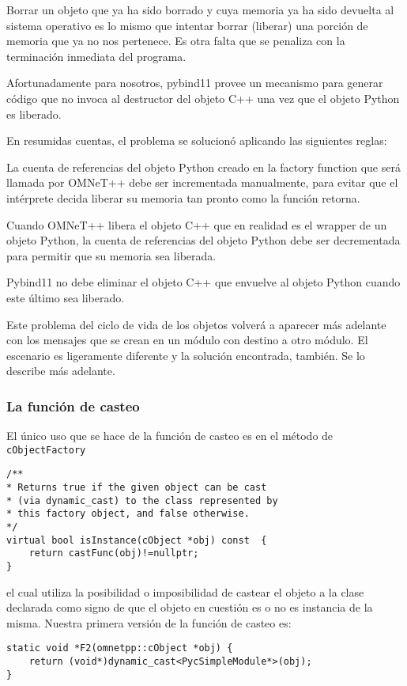 \documentclass[]{article}
\begin{document}
Borrar un objeto que ya ha sido borrado y cuya memoria ya ha sido devuelta al
sistema operativo es lo mismo que intentar borrar (liberar) una porción de
memoria que ya no nos pertenece. Es otra falta que se penaliza con la
terminación inmediata del programa.

Afortunadamente para nosotros, pybind11 provee un mecanismo para generar código
que no invoca al destructor del objeto C++ una vez que el objeto Python es
liberado.

En resumidas cuentas, el problema se solucionó aplicando las siguientes reglas:

La cuenta de referencias del objeto Python creado en la factory function que
será llamada por OMNeT++ debe ser incrementada manualmente, para evitar que el
intérprete decida liberar su memoria tan pronto como la función retorna.

Cuando OMNeT++ libera el objeto C++ que en realidad es el wrapper de un objeto
Python, la cuenta de referencias del objeto Python debe ser decrementada para
permitir que su memoria sea liberada.

Pybind11 no debe eliminar el objeto C++ que envuelve al objeto Python cuando
este último sea liberado.

Este problema del ciclo de vida de los objetos volverá a aparecer más adelante
con los mensajes que se crean en un módulo con destino a otro módulo. El
escenario es ligeramente diferente y la solución encontrada, también. Se lo
describe más adelante.

\subsubsection{La función de casteo}

El único uso que se hace de la función de casteo es en el método de
\verb!cObjectFactory!

\begin{verbatim}
/**
* Returns true if the given object can be cast
* (via dynamic_cast) to the class represented by
* this factory object, and false otherwise.
*/
virtual bool isInstance(cObject *obj) const  {
    return castFunc(obj)!=nullptr;
}
\end{verbatim}

el cual utiliza la posibilidad o imposibilidad de castear el objeto a la clase
declarada como signo de que el objeto en cuestión es o no es instancia de la
misma. Nuestra primera versión de la función de casteo es:

\begin{verbatim}
static void *F2(omnetpp::cObject *obj) {
    return (void*)dynamic_cast<PycSimpleModule*>(obj);
}
\end{verbatim}
\end{document}
